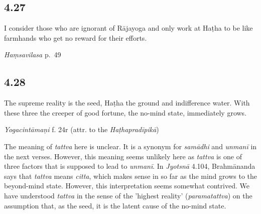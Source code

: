 \begin{ekdosis}
\subsection*{4.27}
\begin{translation}[hp04_027]
I consider those who are ignorant of Rājayoga and only work at Haṭha to be like farmhands who get no reward for their efforts.%
\end{translation}


\begin{testimonia}[hp04_027]
\emph{Haṃsavilasa} p.~49
\begin{versinnote}
\end{versinnote}
\end{testimonia}


\subsection*{4.28}
\begin{translation}[hp04_028]
The supreme reality is the seed, Haṭha the ground and indifference water. With these three the creeper of good fortune, the no-mind state, immediately grows.
\end{translation}


\begin{testimonia}[hp04_028]
\emph{Yogacintāmaṇi} f. 24r (attr. to the \emph{Haṭhapradīpikā})
\begin{versinnote}
\end{versinnote}
\end{testimonia}

\begin{philcomm}[hp04_028]
The meaning of \emph{tattva} here is unclear. It is a synonym for \emph{samādhi} and \emph{unmanī} in the next verses. However, this meaning seems unlikely here as \emph{tattva} is one of three factors that is supposed to lead to \emph{unmanī}. In \emph{Jyotsnā} 4.104, Brahmānanda says that \emph{tattva} means \emph{citta}, which makes sense in so far as the mind grows to the beyond-mind state. However, this interpretation seems somewhat contrived. We have understood \emph{tattva} in the sense of the 'highest reality' (\emph{paramatattva}) on the assumption that, as the seed, it is the latent cause of the no-mind state.


\end{philcomm}
\end{ekdosis}
